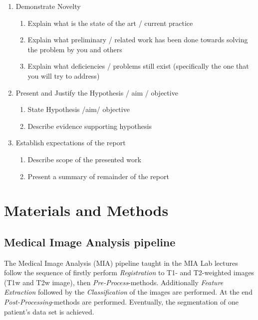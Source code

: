 \documentclass[journal]{IEEEtran}
\begin{document}
{\begin{enumerate}
\begin{enumerate}
		\end{enumerate}
	\item Demonstrate Novelty
		\begin{enumerate}
		\item Explain what is the state of the art / current practice
		\item Explain what preliminary / related work has been done towards solving the problem by you and others
		\item Explain what deficiencies / problems still exist (specifically the one that you will try to address)
		\end{enumerate}
	\item Present and Justify the Hypothesis / aim / objective
		\begin{enumerate}
		\item State Hypothesis /aim/ objective
		\item Describe evidence supporting hypothesis
		\end{enumerate}
	\item Establish expectations of the report
		\begin{enumerate}
		\item Describe scope of the presented work
		\item Present a summary of remainder of the report\\
		\end{enumerate}
	\end{enumerate} 
}



\section{Materials and Methods}

\subsection{Medical Image Analysis pipeline}
	The Medical Image Analysis (MIA) pipeline taught in the MIA Lab lectures follow the sequence of firstly perform {\itshape Registration} to T1- and T2-weighted images (T1w and T2w image), then {\itshape Pre-Process}-methods. Additionally {\itshape Feature Extraction} followed by the {\itshape Classification} of the images are performed. 
	At the end {\itshape Post-Processing}-methods are performed. Eventually, the segmentation of one patient's data set is achieved. 
\end{document}
